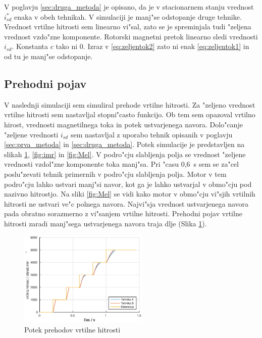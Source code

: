 \documentclass[journal,a4paper,twoside]{sty/IEEEtran}
\begin{document}
V poglavju \ref{sec:druga_metoda} je opisano, da je v stacionarnem stanju vrednost $i_{sd}^*$ enaka v obeh tehnikah. V simulaciji je manj"se odstopanje druge tehnike. Vrednost vrtilne hitrosti sem linearno vi"sal, zato se je spreminjala tudi "zeljena vrednost vzdo"zne komponente. Rotorski magnetni pretok  linearno sledi vrednosti $i_{sd}$. Konstanta $c$ tako ni 0. Izraz v \ref{eq:zeljentok2} zato ni enak \ref{eq:zeljentok1} in od tu je manj"se odstopanje.

\subsection{Prehodni pojav}

V naslednji simulaciji sem simuliral prehode vrtilne hitrosti. Za "zeljeno vrednost vrtilne hitrosti sem nastavljal stopni"casto funkcijo. Ob tem sem opazoval vrtilno hirost, vrednosti magnetilnega toka in potek ustvarjenega navora. Dolo"canje "zeljene vrednosti $i_{sd}$ sem nastavljal z uporabo tehnik opisanih v poglavju \ref{sec:prva_metoda} in \ref{sec:druga_metoda}.
Potek simulacije je predstavljen na slikah \ref{fig:vrtilna}, \ref{fig:imr} in \ref{fig:Mel}. V podro"cju slabljenja polja se vrednost "zeljene vrednosti vzdol"zne komponente toka manj"sa.
Pri "casu 0,6~s  sem se za"cel poslu"zevati tehnik primernih v podro"cju slabljenja polja. Motor v tem podro"cju lahko ustvari manj"si navor, kot ga je lahko ustvarjal v obmo"cju pod nazivno hitrostjo. Na sliki \ref{fig:Mel} se vidi kako motor v obmo"cju vi"sjih vrtilnih hitrosti ne ustvari ve"c polnega navora. Najvi"sja vrednost ustvarjenega navora pada obratno sorazmerno z vi"sanjem vrtilne hitrosti. Prehodni pojav vrtilne hitrosti zaradi manj"sega ustvarjenega navora traja dlje (Slika \ref{fig:vrtilna}).

\begin{figure}
\includegraphics[width=0.55\textwidth]{fig_vrtilna.eps}
\caption{Potek prehodov vrtilne hitrosti}
\label{fig:vrtilna}
\end{figure}
\end{document}
